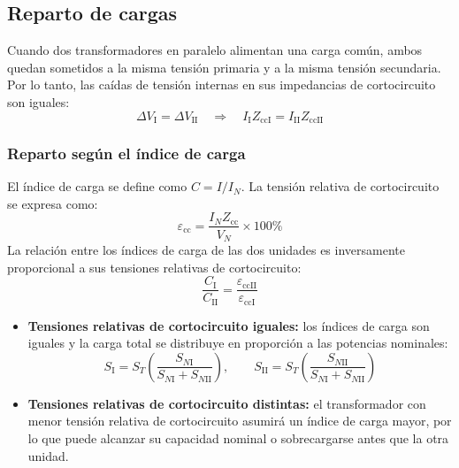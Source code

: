 \documentclass[12pt]{article}
\begin{document}
\subsection{Reparto de cargas}

Cuando dos transformadores en paralelo alimentan una carga com\'un, ambos quedan sometidos a la misma tensi\'on primaria y a la misma tensi\'on secundaria. Por lo tanto, las ca\'idas de tensi\'on internas en sus impedancias de cortocircuito son iguales:
\begin{equation}
    \Delta V_{\mathrm{I}}=\Delta V_{\mathrm{II}}
    \quad\Longrightarrow\quad
    I_{\mathrm{I}}Z_{\mathrm{ccI}}=I_{\mathrm{II}}Z_{\mathrm{ccII}}
\end{equation}

\subsubsection{Reparto seg\'un el \'indice de carga}
El \'indice de carga se define como $C=I/I_N$. La tensi\'on relativa de cortocircuito se expresa como:
\begin{equation}
    \varepsilon_{\mathrm{cc}}=\frac{I_N Z_{\mathrm{cc}}}{V_N}\times 100\%
\end{equation}
La relaci\'on entre los \'indices de carga de las dos unidades es inversamente proporcional a sus tensiones relativas de cortocircuito:
\begin{equation}
    \frac{C_{\mathrm{I}}}{C_{\mathrm{II}}}
    =\frac{\varepsilon_{\mathrm{ccII}}}{\varepsilon_{\mathrm{ccI}}}
\end{equation}

\begin{itemize}
    \item \textbf{Tensiones relativas de cortocircuito iguales:} los \'indices de carga son iguales y la carga total se distribuye en proporci\'on a las potencias nominales:
    \begin{equation}
        S_{\mathrm{I}}=S_T\left(\frac{S_{N\mathrm{I}}}{S_{N\mathrm{I}}+S_{N\mathrm{II}}}\right),
        \qquad
        S_{\mathrm{II}}=S_T\left(\frac{S_{N\mathrm{II}}}{S_{N\mathrm{I}}+S_{N\mathrm{II}}}\right)
    \end{equation}
    \item \textbf{Tensiones relativas de cortocircuito distintas:} el transformador con menor tensi\'on relativa de cortocircuito asumir\'a un \'indice de carga mayor, por lo que puede alcanzar su capacidad nominal o sobrecargarse antes que la otra unidad.
\end{itemize}
\end{document}
